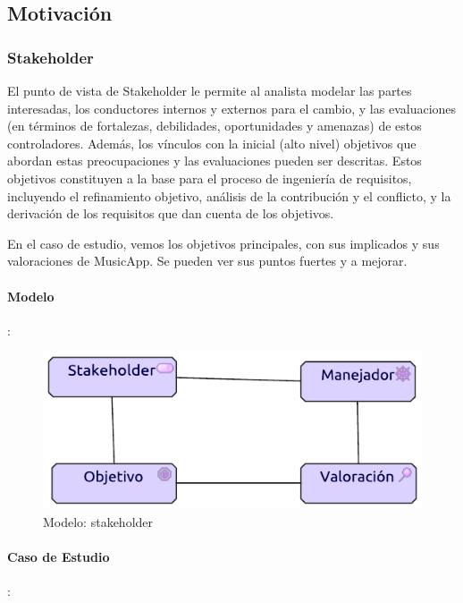 \subsection{Motivación}
\subsubsection{Stakeholder}
El punto de vista de Stakeholder le permite al analista modelar las partes interesadas, los conductores internos y externos para el cambio, y las evaluaciones (en términos de fortalezas, debilidades, oportunidades y amenazas) de estos controladores. Además, los vínculos con la inicial (alto nivel) objetivos que abordan estas preocupaciones y las evaluaciones pueden ser descritas. Estos objetivos constituyen a la base para el proceso de ingeniería de requisitos, incluyendo el refinamiento objetivo, análisis de la contribución y el conflicto, y la derivación de los requisitos que dan cuenta de los objetivos.  \vspace{\baselineskip}

En el caso de estudio, vemos los objetivos principales, con sus implicados y sus valoraciones de MusicApp. Se pueden ver sus puntos fuertes y a mejorar.

\paragraph{Modelo}:
\begin{figure}[h!]
	\centering
	\includegraphics[width=0.6\linewidth]{Desarrollo/ArquitecturaEmpresarial/Motivacion/imgs/stakeholderMetamodelo.pdf}
	\caption{Modelo: stakeholder}
\end{figure}
\newpage
\paragraph{Caso de Estudio}:

